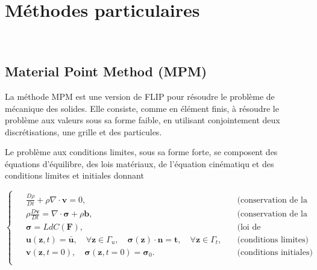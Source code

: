 \section{Méthodes particulaires}~\cite{method_part}
\subsection{Material Point Method (MPM)}

La méthode MPM est une version de FLIP pour résoudre le problème de mécanique des solides.
Elle consiste, comme en élément finis, à résoudre le problème aux valeurs sous sa forme faible, en utilisant conjointement deux discrétisations, une grille et des particules.

Le problème aux conditions limites, sous sa forme forte, se composent des équations d'équilibre, des lois matériaux, de l'équation cinématiqu et des conditions limites et initiales donnant

\begin{equation*}
    \begin{cases}
        \begin{aligned}
             & \frac{D \rho}{Dt} + \rho \nabla \cdot \bm v  =  0                          ,                                                                         & \quad \text{(conservation de la masse)}                  \\
             & \rho \frac{D \bm v}{Dt}                      =  \nabla \cdot \bm \sigma + \rho \bm b,                                                                & \quad  \text{(conservation de la quantité de mouvement)} \\
             & \bm \sigma = LdC(\bm F),                                                                                                                             & \quad  \text{(loi de comportement)}                      \\
             & \bm u(\bm z, t) = \bar{\bm u}, \quad \forall \bm z \in \Gamma_u,    \quad  \bm \sigma (\bm z) \cdot \bm n = \bm t, \quad \forall \bm z \in \Gamma_t, & \quad  \text{(conditions limites)}                       \\&\bm v(\bm z, t = 0), \quad \bm \sigma(\bm z, t= 0) = \bm \sigma_0. & \quad  \text{(conditions initiales)} \\
        \end{aligned}
    \end{cases}
\end{equation*}


